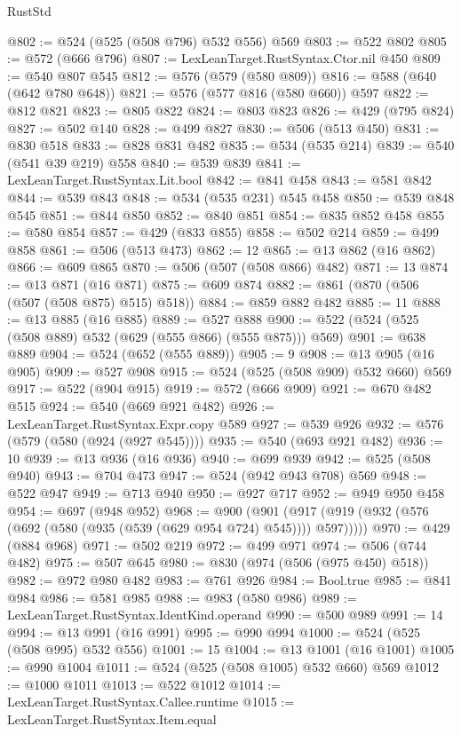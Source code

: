 \begin{lexlean}{RustStd}
\begin{coremodule}
@802 := @524 (@525 (@508 @796) @532 @556) @569
@803 := @522 @802
@805 := @572 (@666 @796)
@807 := LexLeanTarget.RustSyntax.Ctor.nil @450
@809 := @540 @807 @545
@812 := @576 (@579 (@580 @809))
@816 := @588 (@640 (@642 @780 @648))
@821 := @576 (@577 @816 (@580 @660)) @597
@822 := @812 @821
@823 := @805 @822
@824 := @803 @823
@826 := @429 (@795 @824)
@827 := @502 @140
@828 := @499 @827
@830 := @506 (@513 @450)
@831 := @830 @518
@833 := @828 @831 @482
@835 := @534 (@535 @214)
@839 := @540 (@541 @39 @219) @558
@840 := @539 @839
@841 := LexLeanTarget.RustSyntax.Lit.bool
@842 := @841 @458
@843 := @581 @842
@844 := @539 @843
@848 := @534 (@535 @231) @545 @458
@850 := @539 @848 @545
@851 := @844 @850
@852 := @840 @851
@854 := @835 @852 @458
@855 := @580 @854
@857 := @429 (@833 @855)
@858 := @502 @214
@859 := @499 @858
@861 := @506 (@513 @473)
@862 := 12
@865 := @13 @862 (@16 @862)
@866 := @609 @865
@870 := @506 (@507 (@508 @866) @482)
@871 := 13
@874 := @13 @871 (@16 @871)
@875 := @609 @874
@882 := @861 (@870 (@506 (@507 (@508 @875) @515) @518))
@884 := @859 @882 @482
@885 := 11
@888 := @13 @885 (@16 @885)
@889 := @527 @888
@900 := @522 (@524 (@525 (@508 @889) @532 (@629 (@555 @866) (@555 @875))) @569)
@901 := @638 @889
@904 := @524 (@652 (@555 @889))
@905 := 9
@908 := @13 @905 (@16 @905)
@909 := @527 @908
@915 := @524 (@525 (@508 @909) @532 @660) @569
@917 := @522 (@904 @915)
@919 := @572 (@666 @909)
@921 := @670 @482 @515
@924 := @540 (@669 @921 @482)
@926 := LexLeanTarget.RustSyntax.Expr.copy @589
@927 := @539 @926
@932 := @576 (@579 (@580 (@924 (@927 @545))))
@935 := @540 (@693 @921 @482)
@936 := 10
@939 := @13 @936 (@16 @936)
@940 := @699 @939
@942 := @525 (@508 @940)
@943 := @704 @473
@947 := @524 (@942 @943 @708) @569
@948 := @522 @947
@949 := @713 @940
@950 := @927 @717
@952 := @949 @950 @458
@954 := @697 (@948 @952)
@968 := @900
    (@901 (@917 (@919 (@932 (@576 (@692 (@580 (@935 (@539 (@629 @954 @724) @545)))) @597)))))
@970 := @429 (@884 @968)
@971 := @502 @219
@972 := @499 @971
@974 := @506 (@744 @482)
@975 := @507 @645
@980 := @830 (@974 (@506 (@975 @450) @518))
@982 := @972 @980 @482
@983 := @761 @926
@984 := Bool.true
@985 := @841 @984
@986 := @581 @985
@988 := @983 (@580 @986)
@989 := LexLeanTarget.RustSyntax.IdentKind.operand
@990 := @500 @989
@991 := 14
@994 := @13 @991 (@16 @991)
@995 := @990 @994
@1000 := @524 (@525 (@508 @995) @532 @556)
@1001 := 15
@1004 := @13 @1001 (@16 @1001)
@1005 := @990 @1004
@1011 := @524 (@525 (@508 @1005) @532 @660) @569
@1012 := @1000 @1011
@1013 := @522 @1012
@1014 := LexLeanTarget.RustSyntax.Callee.runtime
@1015 := LexLeanTarget.RustSyntax.Item.equal

\end{coremodule}
\end{lexlean}
